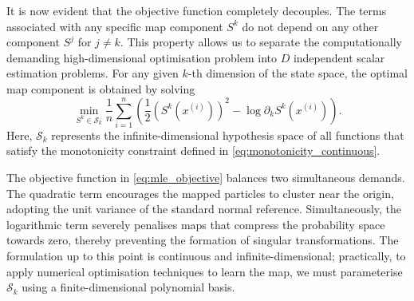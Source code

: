 It is now evident that the objective function completely decouples. The terms associated with any specific map component $S^k$ do not depend on any other component $S^j$ for $j \neq k$. This property allows us to separate the computationally demanding high-dimensional optimisation problem into $D$ independent scalar estimation problems. For any given $k$-th dimension of the state space, the optimal map component is obtained by solving
\begin{equation}
    \boxed{
    \min_{S^k \in \mathcal{S}_k} \frac{1}{n} \sum_{i=1}^n \left( \frac{1}{2} (S^k(x^{(i)}))^2 - \log \partial_k S^k(x^{(i)}) \right)
    }.
    \label{eq:mle_objective}
\end{equation}
Here, $\mathcal{S}_k$ represents the infinite-dimensional hypothesis space of all functions that satisfy the monotonicity constraint defined in \eqref{eq:monotonicity_continuous}. 

The objective function in \eqref{eq:mle_objective} balances two simultaneous demands. The quadratic term encourages the mapped particles to cluster near the origin, adopting the unit variance of the standard normal reference. Simultaneously, the logarithmic term severely penalises maps that compress the probability space towards zero, thereby preventing the formation of singular transformations. The formulation up to this point is continuous and infinite-dimensional; practically, to apply numerical optimisation techniques to learn the map, we must parameterise $\mathcal{S}_k$ using a finite-dimensional polynomial basis.